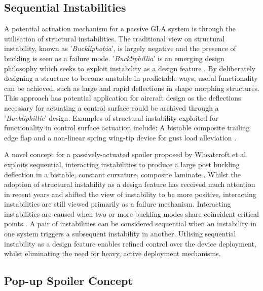 \documentclass{IEEEtran}
\begin{document}
		\subsection{Sequential Instabilities}
		A potential actuation mechanism for a passive GLA system is through the utilisation of structural instabilities. The traditional view on structural instability, known as '\textit{Buckliphobia}', is largely negative and the presence of buckling is seen as a failure mode. '\textit{Buckliphillia}' is an emerging design philosophy which seeks to exploit instability as a design feature \cite{Reis_2015}. By deliberately designing a structure to become unstable in predictable ways, useful functionality can be achieved, such as large and rapid deflections in shape morphing structures. This approach has potential application for aircraft design as the deflections necessary for actuating a control surface could be archived through a '\textit{Buckliphillic}' design. Examples of structural instability exploited for functionality in control surface actuation include: A bistable composite trailing edge flap \cite{Daynes2010} and a non-linear spring wing-tip device for gust load alleviation \cite{Castrichini2017}.
		
		A novel concept for a passively-actuated spoiler proposed by Wheatcroft et al. exploits sequential, interacting instabilities to produce a large post buckling deflection in a bistable, constant curvature, composite laminate \cite{Wheatcroft_2023}. Whilst the adoption of structural instability as a design feature has received much attention in recent years and shifted the view of instability to be more positive, interacting instabilities are still viewed primarily as a failure mechanism. Interacting instabilities are caused when two or more buckling modes share coincident critical points \cite{Wheatcroft_2023}. A pair of instabilities can be considered sequential when an instability in one system triggers a subsequent instability in another. Utlising sequential instability as a design feature enables refined control over the device deployment, whilst eliminating the need for heavy, active deployment mechanisms.
		
		\subsection{Pop-up Spoiler Concept}
		
\end{document}

